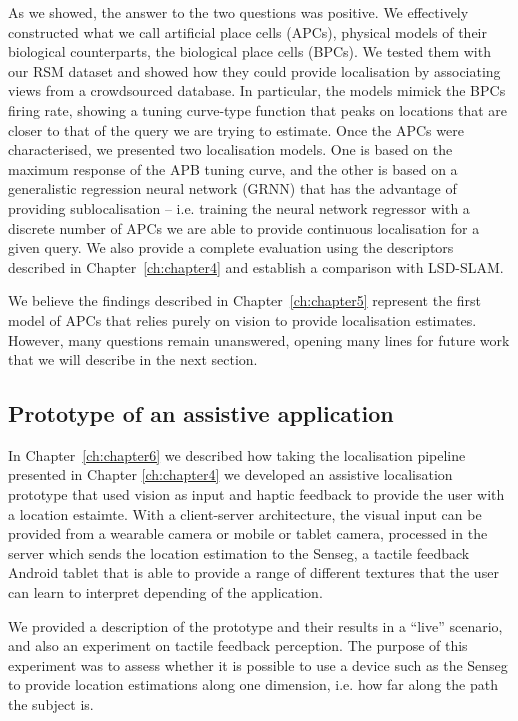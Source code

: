 As we showed, the answer to the two questions was positive. We effectively constructed what we call artificial place cells (APCs), physical models of their biological counterparts, the biological place cells (BPCs). We tested them with our RSM dataset and showed how they could provide localisation by associating views from a crowdsourced database. In particular, the models mimick the BPCs firing rate, showing a tuning curve-type function that peaks on locations that are closer to that of the query we are trying to estimate. Once the APCs were characterised, we presented two localisation models. One is based on the maximum response of the APB tuning curve, and the other is based on a generalistic regression neural network (GRNN) that has the advantage of providing sublocalisation -- i.e. training the neural network regressor with a discrete number of APCs we are able to provide continuous localisation for a given query. We also provide a complete evaluation using the descriptors described in Chapter~\ref{ch:chapter4} and establish a comparison with LSD-SLAM.

We believe the findings described in Chapter~\ref{ch:chapter5} represent the first model of APCs that relies purely on vision to provide localisation estimates. However, many questions remain unanswered, opening many lines for future work that we will describe in the next section. 

\subsection{Prototype of an assistive application}

In Chapter~\ref{ch:chapter6} we described how taking the localisation pipeline presented in Chapter \ref{ch:chapter4} we developed an assistive localisation prototype that used vision as input and haptic feedback to provide the user with a location estaimte. With a client-server architecture, the visual input can be provided from a wearable camera or mobile or tablet camera, processed in the server which sends the location estimation to the Senseg, a tactile feedback Android tablet that is able to provide a range of different textures that the user can learn to interpret depending of the application.

We provided a description of the prototype and their results in a ``live'' scenario, and also an experiment on tactile feedback perception. The purpose of this experiment was to assess whether it is possible to use a device such as the Senseg to provide location estimations along one dimension, i.e. how far along the path the subject is. 

